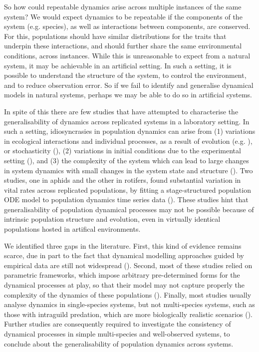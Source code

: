 \documentclass[11pt, oneside]{article}
\begin{document}
So how could repeatable dynamics arise across multiple instances of the same system?
We would expect dynamics to be repeatable if the components of the system (e.g. species), as well as interactions between components, are conserved.
For this, populations should have similar distributions for the traits that underpin these interactions, and should further share the same environmental conditions, across instances.
While this is unreasonable to expect from a natural system, it may be achievable in an artificial setting.
In such a setting, it is possible to understand the structure of the system, to control the environment, and to reduce observation error.
So if we fail to identify and generalise dynamical models in natural systems, perhaps we may be able to do so in artificial systems. 

In spite of this there are few studies that have attempted to characterise the generalisability of dynamics across replicated systems in a laboratory setting.
In such a setting, idiosyncrasies in population dynamics can arise from (1) variations in ecological interactions and individual processes, as a result of evolution (e.g. \cite{Yoshida2003}), or stochasticity (\cite{Dallas2021}), (2) variations in initial conditions due to the experimental setting (\cite{Yoshida2003, Becks2010, DeMeester2019}), and (3) the complexity of the system which can lead to large changes in system dynamics with small changes in the system state and structure (\cite{Adamson2013}).
Two studies, one in aphids and the other in rotifers, found substantial variation in vital rates across replicated populations, by fitting a stage-structured population ODE model to population dynamics time series data (\cite{Bruijning2019,Rosenbaum2019}). 
These studies hint that generalisability of population dynamical processes may not be possible because of intrinsic population structure and evolution, even in virtually identical populations hosted in artifical environments.

We identified three gaps in the literature.
First, this kind of evidence remains scarce, due in part to the fact that dynamical modelling approaches guided by empirical data are still not widespread (\cite{Pontarp2019}).
Second, most of these studies relied on parametric frameworks, which impose arbitrary pre-determined forms for the dynamical processes at play, so that their model may not capture properly the complexity of the dynamics of these populations (\cite{Jost2000,Adamson2013,Bonnaffe2021a}). 
Finally, most studies usually analyse dynamics in single-species systems, but not multi-species systems, such as those with intraguild predation, which are more biologically realistic scenarios (\cite{Hiltunen2013}).
Further studies are consequently required to investigate the consistency of dynamical processes in simple multi-species and well-observed systems, to conclude about the generalisability of population dynamics across systems.
\end{document}
